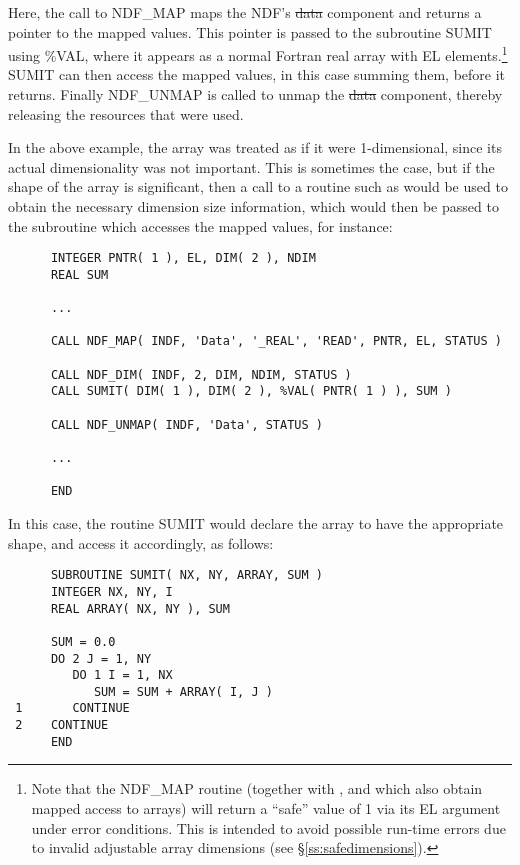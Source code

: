Here, the call to NDF\_MAP maps the NDF's \st{data\/} component and returns a
pointer to the mapped values. 
This pointer is passed to the subroutine SUMIT using \%VAL, where it
appears as a normal Fortran real array with EL elements.\footnote{Note that
the NDF\_MAP routine (together with ,  and 
which also obtain mapped access to arrays) will return a ``safe'' value of 1
via its EL argument under error conditions. 
This is intended to avoid possible run-time errors due to invalid
adjustable array dimensions (see \S\ref{ss:safedimensions}).}
SUMIT can then access the mapped values, in this case summing them, before 
it returns.
Finally NDF\_UNMAP is called to unmap the \st{data\/} component, thereby
releasing the resources that were used. 

In the above example, the array was treated as if it were 1-dimensional,
since its actual dimensionality was not important. 
This is sometimes the case, but if the shape of the array is significant,
then a call to a routine such as  would be used to obtain the
necessary dimension size information, which would then be passed to the
subroutine which accesses the mapped values, for instance: 

\small
\begin{verbatim}
      INTEGER PNTR( 1 ), EL, DIM( 2 ), NDIM
      REAL SUM

      ...

      CALL NDF_MAP( INDF, 'Data', '_REAL', 'READ', PNTR, EL, STATUS )

      CALL NDF_DIM( INDF, 2, DIM, NDIM, STATUS )
      CALL SUMIT( DIM( 1 ), DIM( 2 ), %VAL( PNTR( 1 ) ), SUM )

      CALL NDF_UNMAP( INDF, 'Data', STATUS )

      ...

      END
\end{verbatim}
\normalsize

In this case, the routine SUMIT would declare the array to have the
appropriate shape, and access it accordingly, as follows: 

\small
\begin{verbatim}
      SUBROUTINE SUMIT( NX, NY, ARRAY, SUM )
      INTEGER NX, NY, I
      REAL ARRAY( NX, NY ), SUM

      SUM = 0.0
      DO 2 J = 1, NY
         DO 1 I = 1, NX
            SUM = SUM + ARRAY( I, J )
 1       CONTINUE
 2    CONTINUE
      END
\end{verbatim}
\normalsize

